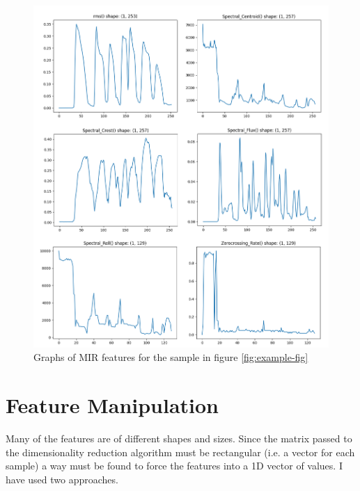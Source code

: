 \documentclass[a4paper, 12pt, twoside]{report}
\begin{document}
\begin{figure}[h!]
\centering
\includegraphics[width=.7\linewidth]{./Figures/mir_features.png}
\caption{Graphs of MIR features for the sample in figure \ref{fig:example-fig}}
\end{figure}

\section{Feature Manipulation}
\label{sec:org694b75f}

Many of the features are of different shapes and sizes. Since the matrix passed to the dimensionality reduction algorithm must be rectangular (i.e. a vector for each sample) a way must be found to force the features into a 1D vector of values. I have used two approaches.
\end{document}
